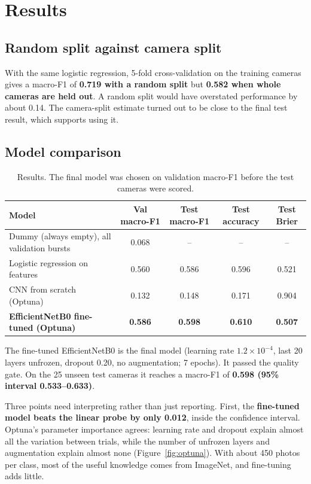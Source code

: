 \documentclass[11pt,a4paper]{article}
\begin{document}
\section{Results}

\subsection{Random split against camera split}
With the same logistic regression, 5-fold cross-validation on the training cameras gives a macro-F1 of
\textbf{0.719 with a random split} but \textbf{0.582 when whole cameras are held out}. A random split
would have overstated performance by about 0.14. The camera-split estimate turned out to be close to the
final test result, which supports using it.

\subsection{Model comparison}

\begin{table}[H]
\centering\small
\begin{tabular}{lcccc}
\toprule
Model & Val macro-F1 & Test macro-F1 & Test accuracy & Test Brier \\
\midrule
Dummy (always empty), all validation bursts & 0.068 & -- & -- & -- \\
Logistic regression on features & 0.560 & 0.586 & 0.596 & 0.521 \\
CNN from scratch (Optuna) & 0.132 & 0.148 & 0.171 & 0.904 \\
\textbf{EfficientNetB0 fine-tuned (Optuna)} & \textbf{0.586} & \textbf{0.598} & \textbf{0.610} & \textbf{0.507} \\
\bottomrule
\end{tabular}
\caption{Results. The final model was chosen on validation macro-F1 before the test cameras were scored.}
\end{table}

The fine-tuned EfficientNetB0 is the final model (learning rate $1.2\times10^{-4}$, last 20 layers unfrozen,
dropout 0.20, no augmentation; 7 epochs). It passed the quality gate. On the 25 unseen test cameras it reaches a
macro-F1 of \textbf{0.598 (95\% interval 0.533--0.633)}.

Three points need interpreting rather than just reporting. First, the \textbf{fine-tuned model beats the
linear probe by only 0.012}, inside the confidence interval. Optuna's parameter importance agrees:
learning rate and dropout explain almost all the variation between trials, while the number of unfrozen
layers and augmentation explain almost none (Figure~\ref{fig:optuna}). With about 450 photos per class,
most of the useful knowledge comes from ImageNet, and fine-tuning adds little.
\end{document}
